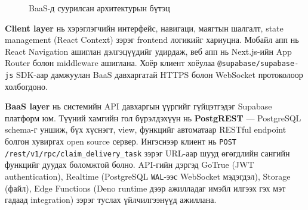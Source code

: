 \begin{figure}[H]
\centering
{}
\caption{BaaS-д суурилсан архитектурын бүтэц}
\label{fig:layered_architecture}
\end{figure}

\textbf{Client layer} нь хэрэглэгчийн интерфейс, навигаци, маягтын шалгалт, state management (React Context) зэрэг frontend логикийг хариуцна. Мобайл апп нь React Navigation ашиглан дэлгэцүүдийг удирдаж, веб апп нь Next.js-ийн App Router болон middleware ашиглана. Хоёр клиент хоёулаа \texttt{@supabase/supabase-js} SDK-аар дамжуулан BaaS давхаргатай HTTPS болон WebSocket протоколоор холбогдоно.

\textbf{BaaS layer} нь системийн API давхаргын үүргийг гүйцэтгэдэг Supabase платформ юм. Түүний хамгийн гол бүрэлдэхүүн нь \textbf{PostgREST} — PostgreSQL schema-г уншиж, бүх хүснэгт, view, функцийг автоматаар RESTful endpoint болгон хувиргах open source сервер. Ингэснээр клиент нь \texttt{POST /rest/v1/rpc/claim\_delivery\_task} зэрэг URL-аар шууд өгөгдлийн сангийн функцийг дуудах боломжтой болно. API-гийн дэргэд GoTrue (JWT authentication), Realtime (PostgreSQL \texttt{WAL}-ээс WebSocket мэдэгдэл), Storage (файл), Edge Functions (Deno runtime дээр ажилладаг имэйл илгээх гэх мэт гадаад integration) зэрэг туслах үйлчилгээнүүд ажиллана.

